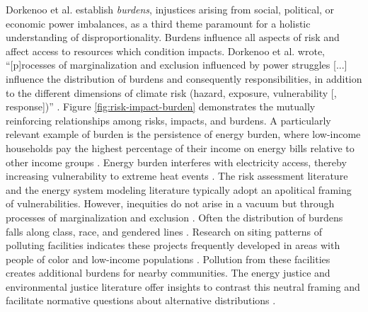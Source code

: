 Dorkenoo et al. \cite{dorkenoo_critical_2022} establish \textit{burdens},
injustices arising from social, political, or economic power imbalances, as a
third theme paramount for a holistic understanding of
disproportionality. Burdens influence all aspects of risk and affect access to
resources which condition impacts. Dorkenoo et al. wrote, ``[p]rocesses of
marginalization and exclusion influenced by power struggles [...] influence the
distribution of burdens and consequently responsibilities, in addition to the
different dimensions of climate risk (hazard, exposure, vulnerability [,
response])'' \cite{dorkenoo_critical_2022}. Figure \ref{fig:risk-impact-burden}
demonstrates the mutually reinforcing relationships among risks, impacts, and
burdens. A particularly relevant example of burden is the persistence of energy
burden, where low-income households pay the highest percentage of their income
on energy bills relative to other income groups \cite{brown_high_2020,
cong_unveiling_2022}. Energy burden interferes with electricity access, thereby
increasing vulnerability to extreme heat events \cite{cong_unveiling_2022,
klinenberg_heat_2003}. The risk assessment literature and the energy
system modeling literature typically adopt an apolitical framing of
vulnerabilities. However, inequities do not arise in a vacuum but through
processes of marginalization and exclusion \cite{thomas_explaining_2019}. Often
the distribution of burdens falls along class, race, and gendered lines
\cite{thomas_explaining_2019,mohai_which_2015}. Research on siting patterns of
polluting facilities indicates these projects frequently developed in areas with
people of color and low-income populations \cite{mohai_which_2015}. Pollution
from these facilities creates additional burdens for nearby communities. The
energy justice and environmental justice literature offer insights to contrast this
neutral framing and facilitate normative questions about alternative
distributions \cite{dorkenoo_critical_2022, thomas_explaining_2019}.

